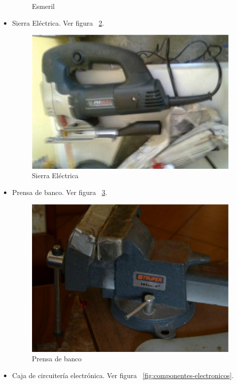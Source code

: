 \begin{itemize}
\begin{figure}[h!]
      \caption{Esmeril}
      \label{fig:esmeril}
    \end{figure}
  \item Sierra Eléctrica. Ver figura ~\ref{fig:sierra-electrica}.
    \begin{figure}[h!]
      \centering
      \includegraphics[scale=0.5]{images/company/sierra-electrica.png}
      \caption{Sierra Eléctrica}
      \label{fig:sierra-electrica}
    \end{figure}
  \item Prensa de banco. Ver figura ~\ref{fig:prensa-banco}.
    \begin{figure}[h!]
      \centering
      \includegraphics[scale=0.5]{images/company/prensa-banco.png}
      \caption{Prensa de banco}
      \label{fig:prensa-banco}
    \end{figure}
  \item Caja de circuitería electrónica. Ver figura ~\ref{fig:componentes-electronicos}.

\end{itemize}
